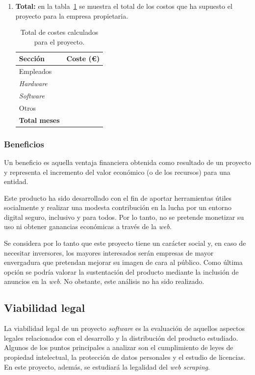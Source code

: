\begin{enumerate}
\item\textbf{Total:} en la tabla~\ref{a:costes} se muestra el total de los costos que ha supuesto el proyecto para la empresa propietaria.

\begin{table}[p]
	\centering
	\begin{tabular}{l r}
		\toprule
		\textbf{Sección} & \textbf{Coste (€)} \\
		\midrule
		Empleados & \\
		\textit{Hardware} & \\
		\textit{Software} & \\
		Otros & \\
		\midrule
		\textbf{Total meses} & \\
		\bottomrule
	\end{tabular}
	\caption[Costes: total]{Total de costes calculados para el proyecto.}
	\label{a:costes}
\end{table}
\end{enumerate}

\subsubsection{Beneficios}

Un beneficio es aquella ventaja financiera obtenida como resultado de un proyecto y representa el incremento del valor económico (o de los recursos) para una entidad.

Este producto ha sido desarrollado con el fin de aportar herramientas útiles socialmente y realizar una modesta contribución en la lucha por un entorno digital seguro, inclusivo y para todos. Por lo tanto, no se pretende monetizar su uso ni obtener ganancias económicas a través de la \textit{web}.

Se considera por lo tanto que este proyecto tiene un carácter social y, en caso de necesitar inversores, los mayores interesados serán empresas de mayor envergadura que pretendan mejorar su imagen de cara al público. Como última opción se podría valorar la sustentación del producto mediante la inclusión de anuncios en la \textit{web}. No obstante, este análisis no ha sido realizado.

\subsection{Viabilidad legal}
\label{s:vl}

La viabilidad legal de un proyecto \textit{software} es la evaluación de aquellos aspectos legales relacionados con el desarrollo y la distribución del producto estudiado. Algunos de los puntos principales a analizar son el cumplimiento de leyes de propiedad intelectual, la protección de datos personales y el estudio de licencias. En este proyecto, además, se estudiará la legalidad del \textit{web scraping}.

